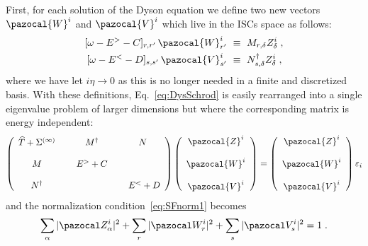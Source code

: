 First, for each solution of the Dyson equation we define two new vectors $\pazocal{W}^i$ and  $\pazocal{V}^i$ which live in the ISCs space as follows:
\begin{align}
 [\omega - E^> -C ]_{r,r'}  \, \pazocal{W}^i_{r'}  ~\equiv{}&~
M_{r,\delta}   Z^i_\delta  \; ,
 \nonumber \\
  [\omega - E^< -D ]_{s,s'} \, \pazocal{V}^i_{s'} ~\equiv{}&~
   N^\dagger_{s,\delta}    Z^i_\delta \; ,
 \label{eq:defWV}
\end{align}
where we have let $i\eta\rightarrow 0$ as this is no longer needed in a finite and discretized basis. With these definitions, Eq.~\eqref{eq:DysSchrod}  is easily rearranged into a single eigenvalue problem of larger dimensions but where the corresponding matrix is energy independent:
\begin{equation}
\left( \begin{array}{ccccc}
 \widehat{T} + \Sigma^{(\infty)}  &~&   M^\dagger   &~&  N~  \\
&&\\
    M   &&  E^>+C  && \\
    &&\\
    N^\dagger    &&      &&  E^<+D
\end{array} \right)
\left( \begin{array}{c}
\pazocal{Z}^i \\ ~ \\ \pazocal{W}^i \\~ \\ \pazocal{V}^i
\end{array} \right)
=\left( \begin{array}{c}
  \pazocal{Z}^i \\ ~\\ \pazocal{W}^i \\~\\ \pazocal{V}^i
\end{array} \right)
  \varepsilon_i
\label{eq:DysMtx}
\end{equation}
and the normalization condition~\eqref{eq:SFnorm1} becomes
\begin{equation}
\sum_\alpha  |\pazocal Z^i_\alpha|^2 + \sum_r  |\pazocal W^i_r|^2 + \sum_s  |\pazocal V^i_s|^2 = 1   \; .
\label{eq:SFnorm2}
\end{equation}

